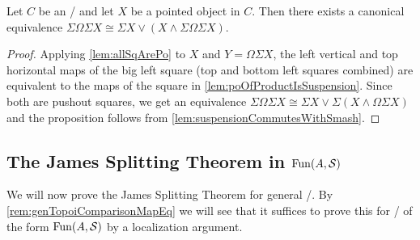 \begin{corollary}\label{cor:fundamentalJamesSplitting}
    Let $C$ be an \inftytop/ and let $X$ be a pointed object in $C$. 
    Then there exists a canonical equivalence $\Sigma\Omega\Sigma X\cong\Sigma X\vee\left(X\wedge\Sigma\Omega\Sigma X\right)$.
    \begin{proof}
        Applying \cref{lem:allSqArePo} to $X$ and $Y=\Omega\Sigma X$, the left vertical and top horizontal maps of the big left square (top and bottom left squares combined) are equivalent to the maps of the square in \cref{lem:poOfProductIsSuspension}.
        Since both are pushout squares, we get an equivalence $\Sigma\Omega\Sigma X\cong\Sigma X\vee\Sigma\left(X\wedge\Omega\Sigma X\right)$ and the proposition follows from \cref{lem:suspensionCommutesWithSmash}.
    \end{proof}
\end{corollary}
\subsection*{The James Splitting Theorem in $\operatorname{Fun}(A,\mathcal{S})$}
We will now prove the James Splitting Theorem for general \inftytops/.
By \cref{rem:genTopoiComparisonMapEq} we will see that it suffices to prove this for \inftytops/ of the form $\operatorname{Fun}(A,\mathcal{S})$ by a localization argument.

